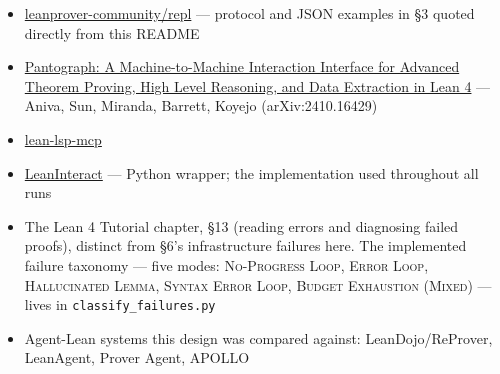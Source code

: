 \begin{itemize}
  \item \href{https://github.com/leanprover-community/repl}{leanprover-community/repl} --- protocol and JSON examples in \S3 quoted directly from this README
  \item \href{https://arxiv.org/abs/2410.16429}{Pantograph: A Machine-to-Machine Interaction Interface for Advanced Theorem Proving, High Level Reasoning, and Data Extraction in Lean 4} --- Aniva, Sun, Miranda, Barrett, Koyejo (arXiv:2410.16429)
  \item \href{https://github.com/oOo0oOo/lean-lsp-mcp}{lean-lsp-mcp}
  \item \href{https://github.com/augustepoiroux/leaninteract}{LeanInteract} --- Python wrapper; the implementation used throughout all runs
  \item The Lean 4 Tutorial chapter, \S13 (reading errors and diagnosing failed proofs), distinct from \S6's infrastructure failures here. The implemented failure taxonomy --- five modes: \textsc{No-Progress Loop}, \textsc{Error Loop}, \textsc{Hallucinated Lemma}, \textsc{Syntax Error Loop}, \textsc{Budget Exhaustion (Mixed)} --- lives in \texttt{classify\_failures.py}
  \item Agent-Lean systems this design was compared against: LeanDojo/ReProver, LeanAgent, Prover Agent, APOLLO
\end{itemize}
